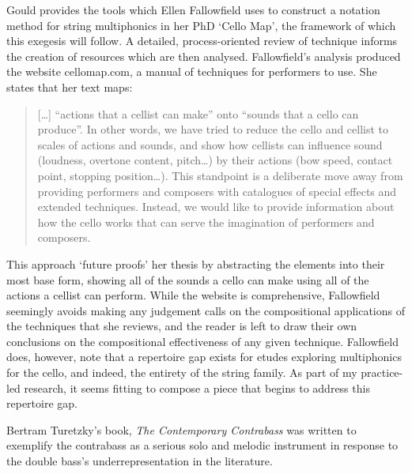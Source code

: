 Gould provides the tools which Ellen Fallowfield uses to construct a notation method for string multiphonics in her PhD ‘Cello Map’, the framework of which this exegesis will follow. 
A detailed, process-oriented review of technique informs the creation of resources which are then analysed.\autocite{fallowfieldCelloMapHandbook2009} 
Fallowfield’s analysis produced the website cellomap.com, a manual of techniques for performers to use. 
She states that her text maps:
\begin{quotation}
    [\ldots] “actions that a cellist can make” onto “sounds that a cello can produce”. 
    In other words, we have tried to reduce the cello and cellist to scales of actions and sounds, and show how cellists can influence sound (loudness, overtone content, pitch…) by their actions (bow speed, contact point, stopping position…). 
    This standpoint is a deliberate move away from providing performers and composers with catalogues of special effects and extended techniques. 
    Instead, we would like to provide information about how the cello works that can serve the imagination of performers and composers.\autocite{fallowfieldCelloMap}
\end{quotation}
This approach ‘future proofs’ her thesis by abstracting the elements into their most base form, showing all of the sounds a cello can make using all of the actions a cellist can perform. 
While the website is comprehensive, Fallowfield seemingly avoids making any judgement calls on the compositional applications of the techniques that she reviews, and the reader is left to draw their own conclusions on the compositional effectiveness of any given technique. 
Fallowfield does, however, note that a repertoire gap exists for etudes exploring multiphonics for the cello, and indeed, the entirety of the string family. 
As part of my practice-led research, it seems fitting to compose a piece that begins to address this repertoire gap.

Bertram Turetzky’s book, \emph{The Contemporary Contrabass} was written to exemplify the contrabass as a serious solo and melodic instrument in response to the double bass's underrepresentation in the literature.\autocite[]{turetzkyContemporaryContrabass1974}

